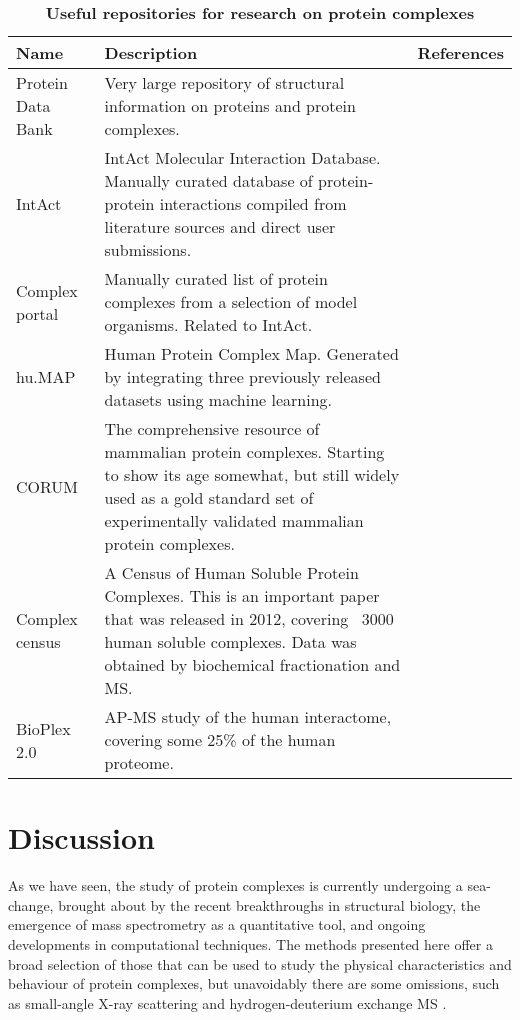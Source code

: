 \documentclass[a4paper,11pt,twoside,openright]{scrbook}
\begin{document}
\begin{table}[h]
    \captionsetup{width=0.85\linewidth}
    \caption[Useful repositories for research on protein complexes]{\sffamily \textbf{Useful repositories for research on protein complexes} \\ \small }
    \centering
    \onehalfspacing
    \small
    \begin{tabular}{p{2.5cm} p{8cm} l}
    \hline
    Name  & Description &   References\\[0.1cm]
    \hline
Protein Data Bank   &   Very large repository of structural information on proteins and protein complexes.  &   \cite{Berman2000}\\
IntAct  & IntAct Molecular Interaction Database. Manually curated database of protein-protein interactions compiled from literature sources and direct user submissions.   &   \cite{Orchard2014}\\
Complex portal  &   Manually curated list of protein complexes from a selection of model organisms. Related to IntAct.  &   \cite{Meldal2015}\\
hu.MAP  &   Human Protein Complex Map. Generated by integrating three previously released datasets using machine learning. &   \cite{Drew2017,Wan2015,Hein2015,Huttlin2015}\\
CORUM   &   The comprehensive resource of mammalian protein complexes. Starting to show its age somewhat, but still widely used as a gold standard set of experimentally validated mammalian protein complexes.  &   \cite{Ruepp2009}\\
Complex census  &   A Census of Human Soluble Protein Complexes. This is an important paper that was released in 2012, covering ~3000 human soluble complexes. Data was obtained by biochemical fractionation and MS.   &   \cite{Havugimana2012}\\
BioPlex 2.0 &   AP-MS study of the human interactome, covering some 25\% of the human proteome. &   \cite{Huttlin2015,Huttlin2017}\\
[0.1cm]
    \hline
    \end{tabular}
    \label{table:databases}
\end{table}

\section{Discussion}
As we have seen, the study of protein complexes is currently undergoing a sea-change, brought about by the recent breakthroughs in structural biology, the emergence of mass spectrometry as a quantitative tool, and ongoing developments in computational techniques. The methods presented here offer a broad selection of those that can be used to study the physical characteristics and behaviour of protein complexes, but unavoidably there are some omissions, such as small-angle X-ray scattering \cite{Mertens2010} and hydrogen-deuterium exchange MS \cite{Zhang2015b}.
\end{document}
